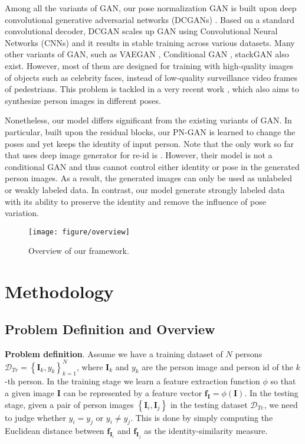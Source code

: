 \documentclass[10pt,letterpaper,twocolumn,10pt,letterpaper,twocolumn]{article}
\begin{document}
\noindent Among all the variants of GAN, our pose normalization GAN
is built upon deep convolutional generative adversarial networks (DCGANs)
\cite{radford2015unsupervised}.
Based on a standard convolutional decoder, DCGAN scales up GAN using
Convolutional Neural Networks (CNNs) and it results in stable training
across various datasets. Many other variants of GAN, such as VAEGAN
\cite{larsen2015autoencoding}, Conditional GAN \cite{isola2016image},
stackGAN \cite{zhang2016stackgan} also exist. However, most of
them are designed for training with high-quality images of objects
such as celebrity faces, instead of low-quality surveillance video
frames of pedestrians. This problem is tackled in a very recent work
\cite{poseguid2017nips}, which also aims to synthesize person images
in different poses.

Nonetheless, our model differs significant from the existing variants of GAN. In particular,  built upon
the residual blocks, our PN-GAN is learned to change the poses and
yet keeps the identity of input person. Note that the only work so
far that uses deep image generator for re-id is \cite{zheng2017unlabeled}.
However, their model is not a conditional GAN and thus cannot
control either identity or pose in the generated person images. As
a result, the generated images can only be used as unlabeled or weakly
labeled data. In contrast, our model generate strongly labeled data
with its ability to preserve the identity and remove the influence
of pose variation.

\begin{figure}
\begin{centering}
\texttt{[image: figure/overview]}
\par\end{centering}
\caption{\label{fig:Overview} Overview of our framework.}
\end{figure}

\vspace{-0.5cm}
\section{Methodology}

\subsection{Problem Definition and Overview\label{subsec:Problem-Setup-and}}

\noindent \textbf{Problem definition}. Assume we have a training dataset
of $N$ persons $\mathcal{D}_{Tr}=\left\{ \mathbf{I}_{k},y_{k}\right\} _{k=1}^{N}$,
where $\mathbf{I}_{k}$ and $y_{k}$ are the person image and person
id of the $k$-th person. In the training stage we learn a feature
extraction function $\phi$ so that a given image $\mathbf{I}$ can
be represented by a feature vector $\mathbf{f}_{\mathbf{I}}=\phi(\mathbf{I})$.
In the testing stage, given a pair of person images $\left\{ \mathbf{I}_{i},\mathbf{I}_{j}\right\} $
in the testing dataset $\mathcal{D}_{Te}$, we need to judge whether
$y_{i}=y_{j}$ or $y_{i}\neq y_{j}$. This is done by simply computing
the Euclidean distance between $\mathbf{f}_{\mathbf{I}_{i}}$ and
$\mathbf{f}_{\mathbf{I}_{j}}$ as the identity-similarity measure.
\end{document}

